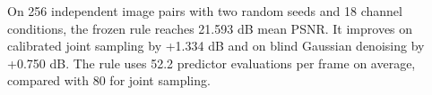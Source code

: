 On 256 independent image pairs with two random seeds and 18 channel conditions, the frozen rule reaches 21.593 dB mean PSNR. It improves on calibrated joint sampling by +1.334 dB and on blind Gaussian denoising by +0.750 dB. The rule uses 52.2 predictor evaluations per frame on average, compared with 80 for joint sampling.
